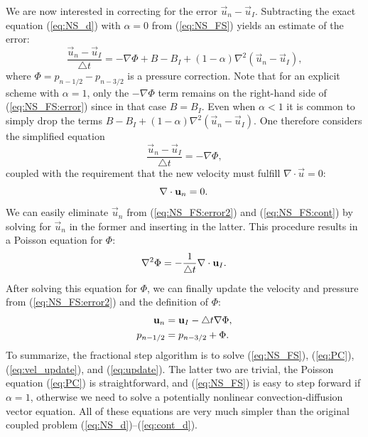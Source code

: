 We are now interested in correcting for the error $\vec{u}_n-\vec{u}_I$.
Subtracting the exact equation (\ref{eq:NS_d}) with
$\alpha = 0$ from
(\ref{eq:NS_FS}) yields an estimate of the error:
\begin{equation}
\label{eq:NS_FS:error}
\frac{{\vec{u}}_{n}-\vec{u}_{I}}{\triangle t} =
-\nabla\Phi + B - B_I + (1-\alpha )\nabla^2(\vec{u}_n-\vec{u}_I),
\end{equation}
where $\Phi = p_{n-1/2} - p_{n-3/2} $ is a pressure correction.
Note that for an explicit scheme with $\alpha = 1$, only the
$-\nabla\Phi$ term remains on the right-hand side of (\ref{eq:NS_FS:error})
since in that case $B=B_I$. Even when $\alpha < 1$ it is common to simply drop
the terms $B - B_I + (1-\alpha)\nabla^2(\vec{u}_n-\vec{u}_I)$.
One therefore considers the simplified equation
\begin{equation}
\label{eq:NS_FS:error2}
\frac{{\vec{u}}_{n}-\vec{u}_{I}}{\triangle t} =
-\nabla\Phi,
\end{equation}
coupled with the requirement that the new velocity must fulfill
$\nabla\cdot\vec{u}=0$:
\begin{equation}
 \label{eq:NS_FS:cont} \nabla \cdot \vec{u}_{n} =0 . \thinspace
\end{equation}
We can easily eliminate $\vec{u}_{n}$ from (\ref{eq:NS_FS:error2})
and (\ref{eq:NS_FS:cont}) by solving for $\vec{u}_{n}$ in the former
and inserting in the latter. This procedure results in a
Poisson equation for $\Phi$:
\begin{equation}
 \label{eq:PC} \nabla^2 \Phi = -\frac{1}{\triangle t} \nabla \cdot {\vec{u}}_{I} . \thinspace
\end{equation}
After solving this equation for $\Phi$, we can
finally update the velocity and pressure from (\ref{eq:NS_FS:error2})
and the definition of $\Phi$:
\begin{align}
 \label{eq:vel_update} \vec{u}_{n} &= {\vec{u}}_{I} - \triangle t \nabla \Phi, \\
  p_{n-1/2} &= p_{n-3/2} + \Phi . \thinspace
\label{eq:update}
\end{align}
To summarize, the fractional step algorithm is to solve
(\ref{eq:NS_FS}), (\ref{eq:PC}), (\ref{eq:vel_update}), and
(\ref{eq:update}). The latter two are trivial, the Poisson
equation (\ref{eq:PC}) is straightforward, and (\ref{eq:NS_FS})
is easy to step forward if $\alpha=1$, otherwise we need to solve
a potentially nonlinear convection-diffusion vector equation.
All of these equations are very much simpler than the
original coupled problem (\ref{eq:NS_d})--(\ref{eq:cont_d}).

